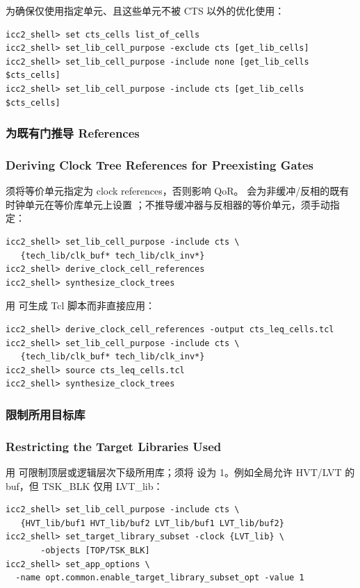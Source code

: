 为确保仅使用指定单元、且这些单元不被 CTS 以外的优化使用：
\begin{lstlisting}
icc2_shell> set cts_cells list_of_cells
icc2_shell> set_lib_cell_purpose -exclude cts [get_lib_cells]
icc2_shell> set_lib_cell_purpose -include none [get_lib_cells $cts_cells]
icc2_shell> set_lib_cell_purpose -include cts [get_lib_cells $cts_cells]
\end{lstlisting}

\subsubsection{为既有门推导 References}
\subsubsection*{Deriving Clock Tree References for Preexisting Gates}

须将等价单元指定为 clock references，否则影响 QoR。 会为非缓冲/反相的既有时钟单元在等价库单元上设置 ；不推导缓冲器与反相器的等价单元，须手动指定：
\begin{lstlisting}
icc2_shell> set_lib_cell_purpose -include cts \
   {tech_lib/clk_buf* tech_lib/clk_inv*}
icc2_shell> derive_clock_cell_references
icc2_shell> synthesize_clock_trees
\end{lstlisting}

用  可生成 Tcl 脚本而非直接应用：
\begin{lstlisting}
icc2_shell> derive_clock_cell_references -output cts_leq_cells.tcl
icc2_shell> set_lib_cell_purpose -include cts \
   {tech_lib/clk_buf* tech_lib/clk_inv*}
icc2_shell> source cts_leq_cells.tcl
icc2_shell> synthesize_clock_trees
\end{lstlisting}

\subsubsection{限制所用目标库}
\subsubsection*{Restricting the Target Libraries Used}

用  可限制顶层或逻辑层次下级所用库；须将  设为 1。例如全局允许 HVT/LVT 的 buf，但 TSK\_BLK 仅用 LVT\_lib：
\begin{lstlisting}
icc2_shell> set_lib_cell_purpose -include cts \
   {HVT_lib/buf1 HVT_lib/buf2 LVT_lib/buf1 LVT_lib/buf2}
icc2_shell> set_target_library_subset -clock {LVT_lib} \
       -objects [TOP/TSK_BLK]
icc2_shell> set_app_options \
  -name opt.common.enable_target_library_subset_opt -value 1
\end{lstlisting}

